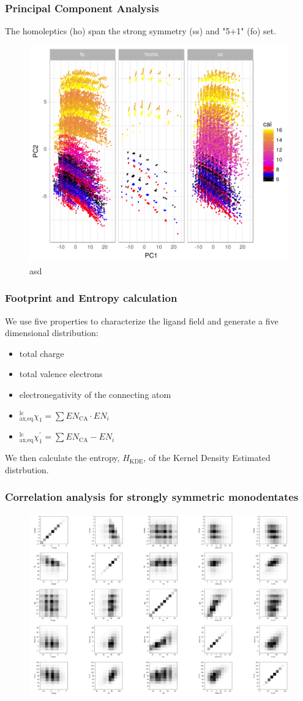 \documentclass[xcolor=dvipsnames]{beamer}
\begin{document}
\begin{frame}
\frametitle{Principal Component Analysis}
The homoleptics (ho) span the strong symmetry (ss) and "5+1" (fo) set.
\begin{figure}
\includegraphics[width=0.65\linewidth]{img/pca.pdf}
\caption{asd} 
\end{figure}
\end{frame}

\begin{frame}
	\frametitle{Footprint and Entropy calculation}
	We use five properties to characterize the ligand field and generate a five dimensional distribution:
	\begin{itemize}
	\item total charge
	\item total valence electrons
	\item electronegativity of the connecting atom
	\item $^{\textrm{lc}}_{\textrm{ax,eq}}\chi_1 = \sum{EN_{\textrm{CA}} \cdot EN_i}$
	\item $^{\textrm{lc}}_{\textrm{ax,eq}}\chi^\prime_1 = \sum{EN_{\textrm{CA}} - EN_i}$
	
	\end{itemize}
	We then calculate the entropy, $H_{\textrm{KDE}}$, of the Kernel Density Estimated distrbution.
\end{frame}

\begin{frame}
\frametitle{Correlation analysis for strongly symmetric monodentates }
\begin{figure}
\includegraphics[width=0.65\linewidth]{img/strongsymMonodentates_PairwiseCorr.png}
\end{figure}
\centering
\end{frame}
\end{document}
